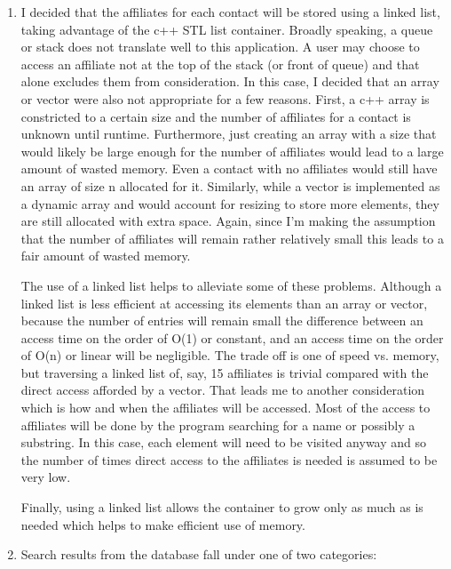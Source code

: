 \documentclass[11pt]{article}
\begin{document}
	\begin{enumerate}
		\item I decided that the affiliates for each contact will be stored using a linked list, taking advantage of the c++ 
			  STL list container. Broadly speaking, a queue or stack does not translate well to this application. A user may
			  choose to access an affiliate not at the top of the stack (or front of queue) and that alone excludes them 
			  from consideration. In this case, I decided that an array or vector were also not appropriate for a few 
			  reasons. First, a c++ array is constricted to a certain size and the number of affiliates for a contact 
			  is unknown until runtime. Furthermore, just creating an array with a size that would likely be large enough 
			  for the number of affiliates would lead to a large amount of wasted memory. Even a contact with no affiliates
			  would still have an array of size n allocated for it. Similarly, while a vector is implemented as a dynamic 
			  array and would account for resizing to store more elements, they are still allocated with extra space. Again,
			  since I'm making the assumption that the number of affiliates will remain rather relatively small this leads 
			  to a fair amount of wasted memory. 
			  
			  The use of a linked list helps to alleviate some of these problems. Although a linked list is less efficient at
			  accessing its elements than an array or vector, because the number of entries will remain small the difference 
			  between an access time on the order of O(1) or constant, and an access time on the order of O(n) or linear will
			  be negligible. The trade off is one of speed vs. memory, but traversing a linked list of, say, 15 affiliates 
			  is trivial compared with the direct access afforded by a vector. That leads me to another consideration which
			  is how and when the affiliates will be accessed. Most of the access to affiliates will be done by the program
			  searching for a name or possibly a substring. In this case, each element will need to be visited anyway and 
			  so the number of times direct access to the affiliates is needed is assumed to be very low.
			  
			  Finally, using a linked list allows the container to grow only as much as is needed which helps to make 
			  efficient use of memory.
			  
		\item Search results from the database fall under one of two categories:
		

\end{enumerate}
\end{document}
